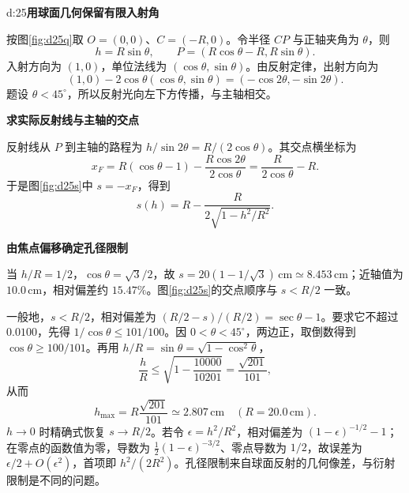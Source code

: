 \begin{drillsolution}{d:25}\textbf{用球面几何保留有限入射角}\par\nobreak
按图\ref{fig:d25q}取 $O=(0,0)$、$C=(-R,0)$。令半径 $CP$ 与正轴夹角为 $\theta$，则
\[
h=R\sin\theta,\qquad P=(R\cos\theta-R,R\sin\theta).
\]
入射方向为 $(1,0)$，单位法线为 $(\cos\theta,\sin\theta)$。由反射定律，出射方向为
\[
(1,0)-2\cos\theta(\cos\theta,\sin\theta)
=(-\cos2\theta,-\sin2\theta).
\]
题设 $\theta<45^\circ$，所以反射光向左下方传播，与主轴相交。

\par\medskip{}\noindent\textbf{求实际反射线与主轴的交点}\par\nobreak
反射线从 $P$ 到主轴的路程为 $h/\sin2\theta=R/(2\cos\theta)$。其交点横坐标为
\[
x_F=R(\cos\theta-1)-\frac{R\cos2\theta}{2\cos\theta}
=\frac R{2\cos\theta}-R.
\]
于是图\ref{fig:d25s}中 $s=-x_F$，得到
\[
\boxed{s(h)=R-\frac{R}{2\sqrt{1-h^2/R^2}}}.
\]

\par\medskip{}\noindent\textbf{由焦点偏移确定孔径限制}\par\nobreak
当 $h/R=1/2$，$\cos\theta=\sqrt3/2$，故 $s=20(1-1/\sqrt3)\,\mathrm{cm}\simeq8.453\,\mathrm{cm}$；近轴值为 $10.0\,\mathrm{cm}$，相对偏差约 $15.47\%$。图\ref{fig:d25s}的交点顺序与 $s<R/2$ 一致。

一般地，$s<R/2$，相对偏差为 $(R/2-s)/(R/2)=\sec\theta-1$。要求它不超过 $0.0100$，先得 $1/\cos\theta\le101/100$。因 $0<\theta<45^\circ$，两边正，取倒数得到 $\cos\theta\ge100/101$。再用 $h/R=\sin\theta=\sqrt{1-\cos^2\theta}$，
\[
 \frac hR\le\sqrt{1-\frac{10000}{10201}}
 =\frac{\sqrt{201}}{101},
\]
从而
\[
\boxed{h_{\max}=R\frac{\sqrt{201}}{101}\simeq2.807\,\mathrm{cm}}
\quad(R=20.0\,\mathrm{cm}).
\]
$h\to0$ 时精确式恢复 $s\to R/2$。若令 $\epsilon=h^2/R^2$，相对偏差为 $(1-\epsilon)^{-1/2}-1$；在零点的函数值为零，导数为 $\tfrac12(1-\epsilon)^{-3/2}$、零点导数为 $1/2$，故误差为 $\epsilon/2+O(\epsilon^2)$，首项即 $h^2/(2R^2)$。孔径限制来自球面反射的几何像差，与衍射限制是不同的问题。
\end{drillsolution}
